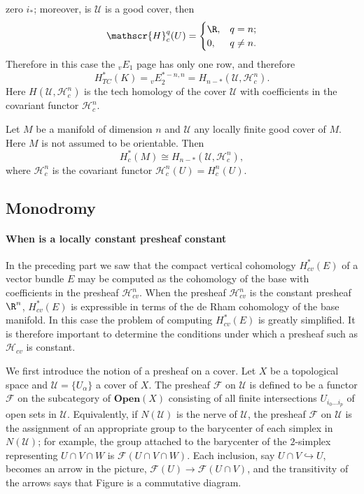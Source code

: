 zero $i_*$; moreover, is $\mathcal{U}$ is a good cover, then
\[\mathscr{H}_c^q(U)=\begin{cases}
\R,&q=n;\\
0,&q\neq n.
\end{cases}\]
Therefore in this case the $_{v}E_1$ page has only one row, and therefore
\[H^*_{TC}(K)={_{v}E_2^{*-n,n}}=H_{n-*}(\mathcal{U},\mathscr{H}^n_c).\]
Here $H(\mathcal{U},\mathscr{H}^n_c)$ is the tech homology of the cover $\mathcal{U}$ with coefficients in the covariant functor $\mathscr{H}_c^{n}$.
\begin{proposition}
Let $M$ be a manifold of dimension $n$ and $\mathcal{U}$ any locally finite good cover of $M$. Here $M$ is not assumed to be orientable. Then
\[H^*_c(M)\cong H_{n-*}(\mathcal{U},\mathscr{H}^n_c),\]
where $\mathscr{H}^n_c$ is the covariant functor $\mathscr{H}^n_c(U)=H^n_c(U)$.
\end{proposition}
\subsection{Monodromy}
\paragraph{When is a locally constant presheaf constant}
In the preceding part we saw that the compact vertical cohomology $H^*_{cv}(E)$ of a vector bundle $E$ may be computed as the cohomology of the base with 
coefficients in the presheaf $\mathscr{H}_{cv}^n$. When the presheaf $\mathscr{H}_{cv}^n$ is the constant presheaf $\R^n$, $H^*_{cv}(E)$ is expressible in terms of the 
de Rham cohomology of the base manifold. In this case the problem of computing $H^*_{cv}(E)$ is greatly simplified. It is therefore important to 
determine the conditions under which a presheaf such as $\mathscr{H}_{cv}$ is constant.\par
We first introduce the notion of a presheaf on a cover. Let $X$ be a topological space and $\mathcal{U}=\{U_\alpha\}$ a cover of $X$. The presheaf $\mathscr{F}$ on 
$\mathcal{U}$ is defined to be a functor $\mathscr{F}$ on the subcategory of $\mathbf{Open}(X)$ consisting of all finite intersections $U_{i_0\dots i_p}$ of open sets in 
$\mathcal{U}$. Equivalently, if $N(\mathcal{U})$ is the nerve of $\mathcal{U}$, the presheaf $\mathscr{F}$ on $\mathcal{U}$ is the assignment of an appropriate group to 
the barycenter of each simplex in $N(\mathcal{U})$; for example, the group attached to the barycenter of the $2$-simplex representing $U\cap V\cap W$ is 
$\mathscr{F}(U\cap V\cap W)$. Each inclusion, say $U\cap V\hookrightarrow U$, becomes an arrow in the picture, $\mathscr{F}(U)\to\mathscr{F}(U\cap V)$, and the 
transitivity of the arrows says that Figure is a commutative diagram.

